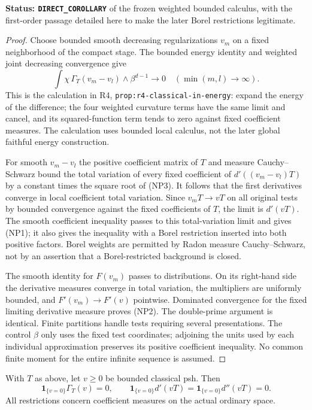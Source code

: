 \noindent\textbf{Status: \texttt{DIRECT\_COROLLARY}} of the
frozen weighted bounded calculus, with the first-order passage detailed
here to make the later Borel restrictions legitimate.

\begin{proof}
Choose bounded smooth decreasing regularizations $v_m$ on a fixed
neighborhood of the compact stage.  The bounded energy identity and
weighted joint decreasing convergence give
\[
 \int\chi\,\Gamma_T(v_m-v_l)\wedge\beta^{d-1}\longrightarrow0
                    \quad(\min(m,l)\longrightarrow\infty).
 \tag{NP3}
\]
This is the calculation in R4,
\texttt{prop:r4-classical-in-energy}: expand the energy of the
difference; the four weighted curvature terms have the same limit
and cancel, and its squared-function term tends to zero against fixed
coefficient measures.  The calculation uses bounded local calculus,
not the later global faithful energy construction.

For smooth $v_m-v_l$ the positive coefficient matrix of $T$ and
measure Cauchy--Schwarz bound the total variation of every fixed
coefficient of $d'((v_m-v_l)T)$ by a constant times the square root
of (NP3).  It follows that the first derivatives converge in local
coefficient total variation.  Since $v_mT\to vT$ on all original
tests by bounded convergence against the fixed coefficients of $T$,
the limit is $d'(vT)$.  The smooth coefficient inequality passes to
this total-variation limit and gives (NP1); it also gives the inequality
with a Borel restriction inserted into both positive factors.  Borel
weights are permitted by Radon measure Cauchy--Schwarz, not by an
assertion that a Borel-restricted background is closed.

The smooth identity for $F(v_m)$ passes to distributions.  On its
right-hand side the derivative measures converge in total variation,
the multipliers are uniformly bounded, and $F'(v_m)\to F'(v)$
pointwise.  Dominated convergence for the fixed limiting derivative
measure proves (NP2).  The double-prime argument is identical.
Finite partitions handle tests requiring several presentations.
The control $\beta$ only uses the fixed test coordinates; adjoining
the units used by each individual approximation preserves its positive
coefficient inequality.  No common finite moment for the entire
infinite sequence is assumed.
\end{proof}

\begin{lemma}
\label{lem:r11-zero-plateau}
With $T$ as above, let $v\geq0$ be bounded classical psh.  Then
\[
 \mathbf1_{\{v=0\}}\Gamma_T(v)=0,\qquad
 \mathbf1_{\{v=0\}}d'(vT)=
 \mathbf1_{\{v=0\}}d''(vT)=0.
 \tag{NP4}
\]
All restrictions concern coefficient measures on the actual ordinary
space.
\end{lemma}

